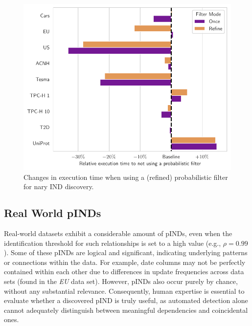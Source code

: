 \begin{figure}[t!]
    \centering
    \includegraphics[width=.48\textwidth]{figures/filter_results.pdf}
    \caption{Changes in execution time when using a (refined) probabilistic filter for nary IND discovery.}
    \label{fig:filter}
\end{figure}

\subsection{Real World pINDs} \label{subsec:real_pINDs}
Real-world datasets exhibit a considerable amount of pINDs, even when the identification threshold for such relationships is set to a high value (e.g., $\rho = 0.99$). Some of these pINDs are logical and significant, indicating underlying patterns or connections within the data. For example, date columns may not be perfectly contained within each other due to differences in update frequencies across data sets (found in the \textit{EU} data set). However, pINDs also occur purely by chance, without any substantial relevance. Consequently, human expertise is essential to evaluate whether a discovered pIND is truly useful, as automated detection alone cannot adequately distinguish between meaningful dependencies and coincidental ones.